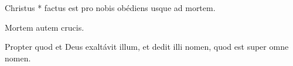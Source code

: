 \newline
Christus * factus est pro nobis obédiens usque ad mortem. 

\newline
Mortem autem crucis. 

\newline
Propter quod et Deus exaltávit illum, et dedit illi nomen, quod est super omne nomen.


